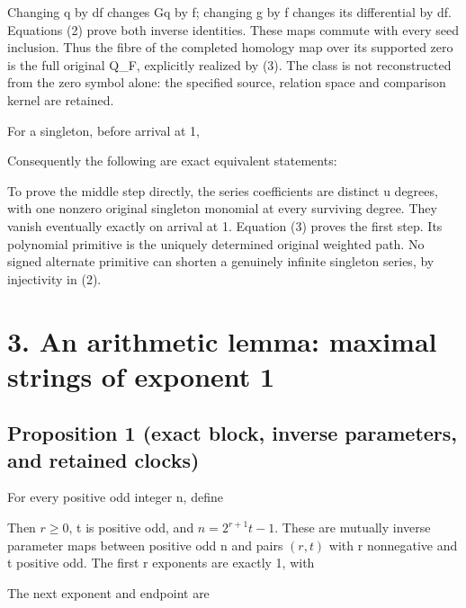 Changing q by df changes Gq by f; changing g by f changes its
differential by df. Equations (2) prove both inverse identities. These
maps commute with every seed inclusion. Thus the fibre of the completed
homology map over its supported zero is the full original Q\_F,
explicitly realized by (3). The class is not reconstructed from the zero
symbol alone: the specified source, relation space and comparison kernel
are retained.

For a singleton, before arrival at 1,


Consequently the following are exact equivalent statements:


To prove the middle step directly, the series coefficients are distinct
u degrees, with one nonzero original singleton monomial at every
surviving degree. They vanish eventually exactly on arrival at 1.
Equation (3) proves the first step. Its polynomial primitive is the
uniquely determined original weighted path. No signed alternate
primitive can shorten a genuinely infinite singleton series, by
injectivity in (2).

\section{3. An arithmetic lemma: maximal strings of exponent 1}

\subsection{Proposition 1 (exact block, inverse parameters, and retained
clocks)}

For every positive odd integer n, define


Then \(r\ge0\), t is positive odd, and \(n=2^{r+1}t-1\). These are
mutually inverse parameter maps between positive odd n and pairs
\((r,t)\) with r nonnegative and t positive odd. The first r exponents
are exactly 1, with


The next exponent and endpoint are


